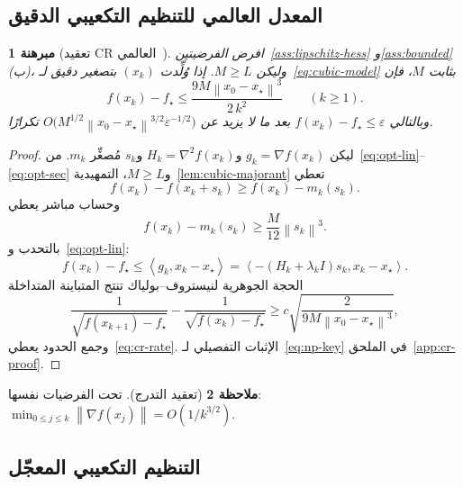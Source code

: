 \documentclass[11pt,a4paper]{article}
\theoremstyle{plain}
\newtheorem{theorem}{مبرهنة}[section]
\theoremstyle{definition}
\newtheorem{remark}[theorem]{ملاحظة}
\newcommand{\norm}[1]{\left\|#1\right\|}
\newcommand{\inner}[2]{\left\langle #1,#2\right\rangle}
\newcommand{\grad}{\nabla}
\newcommand{\hess}{\nabla^{2}}
\begin{document}
\subsection{المعدل العالمي للتنظيم التكعيبي الدقيق}

\begin{theorem}[تعقيد CR العالمي~\cite{nesterov2006cubic}]
\label{thm:cr-rate}
افرض الفرضيتين~\ref{ass:lipschitz-hess} و\ref{ass:bounded}(ب)، وليكن $M\ge L$.
إذا وُلِّدت $(x_{k})$ بتصغير دقيق لـ~\eqref{eq:cubic-model} بثابت $M$، فإن
\begin{equation}
\label{eq:cr-rate}
f(x_{k})-f_{\star}
\le
\frac{9M\norm{x_{0}-x_{\star}}^{3}}{2\,k^{2}}
\qquad(k\ge 1).
\end{equation}
وبالتالي $f(x_{k})-f_{\star}\le\varepsilon$ بعد ما لا يزيد عن
$O\bigl(M^{1/2}\norm{x_{0}-x_{\star}}^{3/2}\varepsilon^{-1/2}\bigr)$ تكرارًا.
\end{theorem}

\begin{proof}
ليكن $g_{k}=\grad f(x_{k})$ و$H_{k}=\hess f(x_{k})$ و$s_{k}$ مُصغِّر $m_{k}$.
من~\eqref{eq:opt-lin}--\eqref{eq:opt-sec} و$M\ge L$، التمهيدية~\ref{lem:cubic-majorant} تعطي
\begin{equation}
f(x_{k})-f(x_{k}+s_{k})
\ge
f(x_{k})-m_{k}(s_{k}).
\end{equation}
وحساب مباشر يعطي~\cite{nesterov2006cubic}
\begin{equation}
f(x_{k})-m_{k}(s_{k})
\ge
\frac{M}{12}\norm{s_{k}}^{3}.
\end{equation}
بالتحدب و~\eqref{eq:opt-lin}:
\begin{equation}
f(x_{k})-f_{\star}
\le
\inner{g_{k}}{x_{k}-x_{\star}}
=
\inner{-(H_{k}+\lambda_{k}I)s_{k}}{x_{k}-x_{\star}}.
\end{equation}
الحجة الجوهرية لنيستروف--بولياك تنتج المتباينة المتداخلة
\begin{equation}
\label{eq:np-key}
\frac{1}{\sqrt{f(x_{k+1})-f_{\star}}}
-
\frac{1}{\sqrt{f(x_{k})-f_{\star}}}
\ge
c\sqrt{\frac{2}{9M\norm{x_{0}-x_{\star}}^{3}}},
\end{equation}
وجمع الحدود يعطي~\eqref{eq:cr-rate}.
الإثبات التفصيلي لـ~\eqref{eq:np-key} في الملحق~\ref{app:cr-proof}.
\end{proof}

\begin{remark}[تعقيد التدرج]
تحت الفرضيات نفسها: $\min_{0\le j\le k}\norm{\grad f(x_{j})}=O(1/k^{3/2})$.
\end{remark}

\subsection{التنظيم التكعيبي المعجّل}
\end{document}
